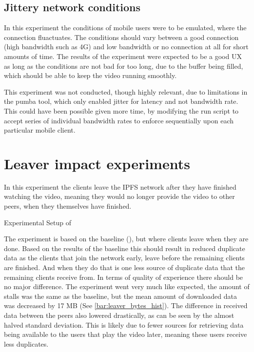 \if{}

\fi

\subsection{Jittery network conditions}
In this experiment the conditions of mobile users were to be emulated, where the connection fluactuates. The conditions should vary between a good connection (high bandwidth such as 4G) and low bandwidth or no connection at all for short amounts of time.
The results of the experiment were expected to be a good \ac{UX} as long as the conditions are not bad for too long, due to the buffer being filled, which should be able to keep the video running smoothly.

This experiment was not conducted, though highly relevant, due to limitations in the pumba tool, which only enabled jitter for latency and not bandwidth rate.
This could have been possible given more time, \eg by modifying the run script to accept series of individual bandwidth rates to enforce sequentially upon each particular mobile client.

\FloatBarrier \section{Leaver impact experiments}
\label{sec:eval_leaver}
In this experiment the clients  leave the \ac{IPFS} network after they have finished watching the video, meaning they would no longer provide the video to other peers, when they themselves have finished.

\begin{table}[!htbp]
    \myfloatalign
    \caption[Experimental Setup of Leaver]{Experimental Setup of }
    \label{tab:exp_overview_leaver}
    
\end{table}

The experiment is based on the baseline (), but where clients leave when they are done. Based on the results of the baseline this should result in reduced duplicate data as the clients that join the network early, leave before the remaining clients are finished. And when they do that is one less source of duplicate data that the remaining clients receive from. In terms of quality of experience there should be no major difference.
The experiment went very much like expected, the amount of stalls was the same as the baseline, but the mean amount of downloaded data was decreased by 17 \ac{MB} (See \autoref{bar:leaver_bytes_hist}). The difference in received data between the peers also lowered drastically, as can be seen by the almost halved standard deviation. This is likely due to fewer sources for retrieving data being available to the users that play the video later, meaning these users receive less duplicates.

